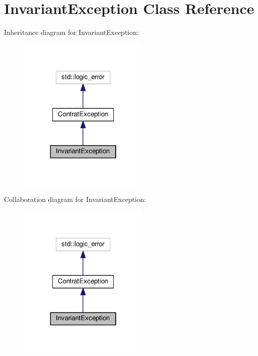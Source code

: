 \hypertarget{classInvariantException}{}\section{Invariant\+Exception Class Reference}
\label{classInvariantException}


Inheritance diagram for Invariant\+Exception\+:\nopagebreak
\begin{figure}[H]
\begin{center}
\leavevmode
\includegraphics[width=178pt]{classInvariantException__inherit__graph}
\end{center}
\end{figure}


Collaboration diagram for Invariant\+Exception\+:\nopagebreak
\begin{figure}[H]
\begin{center}
\leavevmode
\includegraphics[width=178pt]{classInvariantException__coll__graph}
\end{center}
\end{figure}
